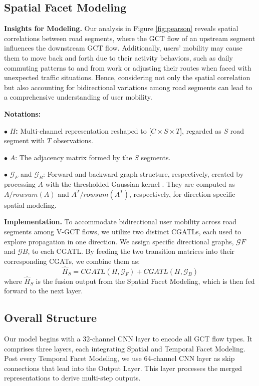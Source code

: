 \documentclass[letterpaper]{article} %
\begin{document}
\subsection{Spatial Facet Modeling}
\noindent \textbf{Insights for Modeling.}
Our analysis in Figure \ref{fig:pearson} reveals spatial correlations between road segments, where the GCT flow of an upstream segment influences the downstream GCT flow. Additionally, users' mobility may cause them to move back and forth due to their activity behaviors, such as daily commuting patterns to and from work or adjusting their routes when faced with unexpected traffic situations. Hence, considering not only the spatial correlation but also accounting for bidirectional variations among road segments can lead to a comprehensive understanding of user mobility.

\noindent \textbf{Notations:}

$\bullet$ \textbf{$H$:} Multi-channel representation reshaped to [$C \times S \times T$], regarded as $S$ road segment with $T$ observations.

$\bullet$ $A$: The adjacency matrix formed by the $S$ segments.

$\bullet$ $\mathcal{G}_{F}$ and $\mathcal{G}_{B}$: Forward and backward graph structure, respectively, created by processing $A$ with the thresholded Gaussian kernel \cite{shuman2013emerging}. They are computed as $A/rowsum(A)$ and $A^{T}/rowsum(A^{T})$, respectively, for direction-specific spatial modeling.

\noindent \textbf{Implementation.}
To accommodate bidirectional user mobility across road segments among V-GCT flows, we utilize two distinct CGATLs, each used to explore propagation in one direction. We assign specific directional graphs, $\mathcal{G}{F}$ and $\mathcal{G}{B}$, to each CGATL. By feeding the two transition matrices into their corresponding CGATs, we combine them as:
\begin{equation}
\hat{H}_{S} = CGATL(H,\mathcal{G}_{F}) + CGATL(H,\mathcal{G}_{B})
\end{equation}
where $\hat{H}_{S}$ is the fusion output from the Spatial Facet Modeling, which is then fed forward to the next layer.

\subsection{Overall Structure}
Our model begins with a 32-channel CNN layer to encode all GCT flow types. It comprises three layers, each integrating Spatial and Temporal Facet Modeling. Post every Temporal Facet Modeling, we use 64-channel CNN layer as skip connections that lead into the Output Layer. This layer processes the merged representations to derive multi-step outputs. 
\end{document}
